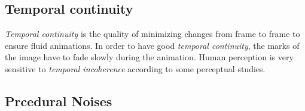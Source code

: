 \subsection{Temporal continuity}

\textit{Temporal continuity} is the quality of minimizing changes from frame to frame to ensure fluid animations. In order to have good \textit{temporal continuity}, the marks of the image have to fade slowly during the animation. Human perception is very sensitive to \textit{temporal incoherence} according to some perceptual studies\cite{percept_studies, Schwarz_2009}.

\subsection{Prcedural Noises}
